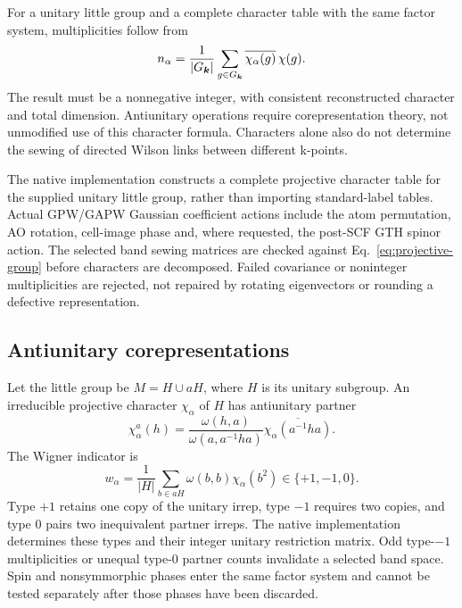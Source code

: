 For a unitary little group and a complete character table with the
same factor system, multiplicities follow from
\begin{equation}
 n_\alpha=\frac{1}{|G_{\bm{k}}|}
 \sum_{g\in G_{\bm{k}}}\overline{\chi_\alpha(g)}\,\chi(g).
 \label{eq:character-decomposition}
\end{equation}
The result must be a nonnegative integer, with consistent reconstructed
character and total dimension. Antiunitary operations require
corepresentation theory, not unmodified use of this character formula.
Characters alone also do not determine the sewing of directed Wilson
links between different k-points.

The native implementation constructs a complete projective character
table for the supplied unitary little group, rather than importing
standard-label tables. Actual GPW/GAPW Gaussian coefficient actions
include the atom permutation, AO rotation, cell-image phase and,
where requested, the post-SCF GTH spinor action. The selected band
sewing matrices are checked against Eq.~\eqref{eq:projective-group}
before characters are decomposed. Failed covariance or noninteger
multiplicities are rejected, not repaired by rotating eigenvectors
or rounding a defective representation.

\subsection{Antiunitary corepresentations}
Let the little group be $M=H\cup aH$, where $H$ is its unitary
subgroup. An irreducible projective character $\chi_\alpha$ of $H$
has antiunitary partner
\begin{equation}
 \chi_\alpha^a(h)=
 \frac{\omega(h,a)}{\omega(a,a^{-1}ha)}
 \overline{\chi_\alpha(a^{-1}ha)} .
 \label{eq:corep-partner}
\end{equation}
The Wigner indicator is~\cite{SpgrepCorepresentations}
\begin{equation}
 w_\alpha=\frac{1}{|H|}\sum_{b\in aH}
                  \omega(b,b)\chi_\alpha(b^2)\in\{+1,-1,0\}.
 \label{eq:wigner-corep}
\end{equation}
Type $+1$ retains one copy of the unitary irrep, type $-1$ requires
two copies, and type $0$ pairs two inequivalent partner irreps.
The native implementation determines these types and their integer
unitary restriction matrix. Odd type-$-1$ multiplicities or unequal
type-$0$ partner counts invalidate a selected band space.
Spin and nonsymmorphic phases enter the same factor system and cannot
be tested separately after those phases have been discarded.

